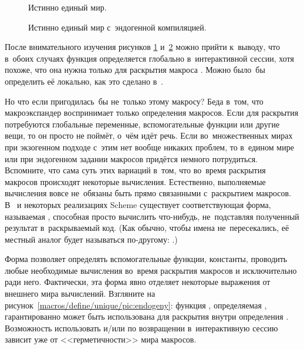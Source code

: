 \begin{figure}\centering

\caption{Истинно единый мир.}%
\label{macros/define/unique/pic:uniquely}
\end{figure}

\begin{figure}\centering

\caption{Истинно единый мир с~эндогенной компиляцией.}%
\label{macros/define/unique/pic:unique-endogeny}
\end{figure}

После внимательного изучения рисунков \ref{macros/define/unique/pic:uniquely}
и~\ref{macros/define/unique/pic:unique-endogeny} можно прийти к~выводу, что
в~обоих случаях функция  определяется глобально в~интерактивной сессии,
хотя похоже, что она нужна только для раскрытия макроса . Можно
было~бы определить её локально, как это сделано в~.

Но что если  пригодилась~бы не~только этому макросу? Беда в~том, что
макроэкспандер воспринимает только определения макросов. Если для раскрытия
потребуются глобальные переменные, вспомогательные функции или другие вещи, то
он просто не поймёт, о~чём идёт речь. Если во~множественных мирах при экзогенном
подходе с~этим нет вообще никаких проблем, то в~едином мире или при эндогенном
задании макросов придётся немного потрудиться. Вспомните, что сама суть этих
вариаций в~том, что во~время раскрытия макросов происходят некоторые вычисления.
Естественно, выполняемые вычисления вовсе не~обязаны быть прямо связанными
с~раскрытием макросов. В~{\CommonLisp} и некоторых реализациях Scheme существует
соответствующая форма, называемая , способная просто вычислить
что-нибудь, не~подставляя полученный результат в~раскрываемый код. (Как обычно,
чтобы имена не~пересекались, её местный аналог будет называться по-другому:
.)

Форма  позволяет определять вспомогательные
функции, константы, проводить любые необходимые вычисления во~время раскрытия
макросов и исключительно ради него. Фактически, эта форма явно отделяет
некоторые выражения от внешнего мира вычислений. Взгляните на
рисунок~\ref{macros/define/unique/pic:endogeny}: функция , определяемая
, гарантированно может быть использована для
раскрытия  внутри определения . Возможность
использовать  \hbox{и/или}  по возвращении
в~интерактивную сессию зависит уже от <<герметичности>> мира макросов.

